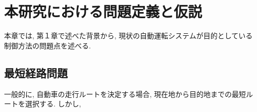 \chapter{本研究における問題定義と仮説}
\label{issue}

本章では, 第１章で述べた背景から, 現状の自動運転システムが目的としている制御方法の問題点を述べる.

\section{最短経路問題}

一般的に, 自動車の走行ルートを決定する場合, 現在地から目的地までの最短ルートを選択する. しかし, 


